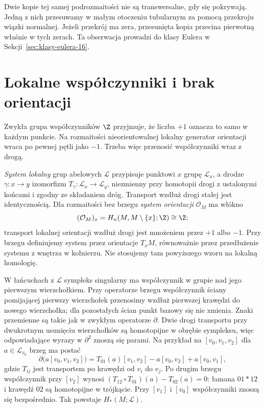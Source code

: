 \begin{uwaga}[Samoprzecięcie]
Dwie kopie tej samej
podrozmaitości nie są
transwersalne, gdy się
pokrywają. Jedną z nich
przesuwamy w małym
otoczeniu tubularnym
za pomocą przekroju
wiązki normalnej.
Jeżeli przekrój ma zera,
przesunięta kopia
przecina pierwotną
właśnie w tych zerach.
Ta obserwacja prowadzi
do klasy Eulera
w Sekcji~\ref{sec:klasy-eulera-16}.
\end{uwaga}

\section{Lokalne współczynniki i brak orientacji}
\label{sec:lokalne-wsp-16}

Zwykła grupa współczynników
$\Z$ przyjmuje, że liczba
$+1$ oznacza to samo w
każdym punkcie. Na rozmaitości
nieorientowalnej lokalny
generator orientacji wraca
po pewnej pętli jako $-1$.
Trzeba więc przenosić
współczynniki wraz z drogą.

\begin{definicja}
\label{def:system-lokalny-16}
\emph{System lokalny} grup abelowych
$\mathcal L$ przypisuje punktowi
$x$ grupę $\mathcal L_x$,
a drodze $\gamma:x\to y$
izomorfizm
$T_\gamma:\mathcal L_x\to\mathcal L_y$,
niezmienny przy homotopii
drogi z ustalonymi końcami
i zgodny ze składaniem dróg.
Transport wzdłuż drogi stałej jest identycznością.
Dla rozmaitości bez brzegu \emph{system orientacji}
$\mathcal O_M$ ma włókno
\[
 (\mathcal O_M)_x
  =H_n(M,M\setminus\{x\};\Z)
  \cong\Z;
\]
transport lokalnej orientacji
wzdłuż drogi jest mnożeniem
przez $+1$ albo $-1$. Przy brzegu definiujemy
system przez orientacje $T_xM$, równoważnie przez
przedłużenie systemu z wnętrza w kołnierzu.
Nie stosujemy tam powyższego wzoru na lokalną homologię.
\end{definicja}

W łańcuchach z $\mathcal L$
sympleks singularny ma
współczynnik w grupie
nad jego pierwszym
wierzchołkiem. Przy operatorze
brzegu współczynnik ściany
pomijającej pierwszy
wierzchołek przenosimy
wzdłuż pierwszej krawędzi
do nowego wierzchołka;
dla pozostałych ścian
punkt bazowy się nie
zmienia. Znaki przemienne
są takie jak w zwykłym
operatorze $\partial$.
Dwie drogi transportu
przy dwukrotnym usunięciu
wierzchołków są homotopijne
w obrębie sympleksu,
więc odpowiadające
wyrazy w $\partial^2$
znoszą się parami.
Na przykład na $[v_0,v_1,v_2]$ dla $a\in\mathcal L_{v_0}$
brzeg ma postać
\[
 \partial\bigl(a[v_0,v_1,v_2]\bigr)
 =T_{01}(a)[v_1,v_2]-a[v_0,v_2]+a[v_0,v_1],
\]
gdzie $T_{ij}$ jest transportem po krawędzi od $v_i$ do $v_j$.
Po drugim brzegu współczynnik przy $[v_2]$ wynosi
$(T_{12}\circ T_{01})(a)-T_{02}(a)=0$:
łamana $01*12$ i krawędź $02$ są homotopijne w trójkącie.
Przy $[v_1]$ i $[v_0]$ współczynniki znoszą się bezpośrednio.
Tak powstaje
$H_*(M;\mathcal L)$.

